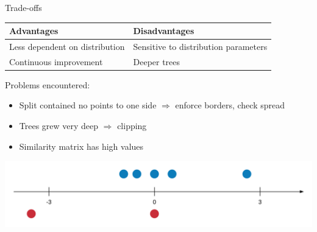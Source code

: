 \documentclass[shortpres]{beamer}
\begin{document}
\begin{frame}{Trade-offs}
    \begin{center}
    \begin{tabular}{p{5cm}|p{5cm}}
        Advantages & Disadvantages \\
        \hline
        \hline
         Less dependent on distribution & Sensitive to distribution parameters \\
         \hline
         Continuous improvement & Deeper trees
    \end{tabular}
    \end{center}
    Problems encountered:
    \begin{itemize}
        \item Split contained no points to one side $\Rightarrow$ enforce borders, check spread
        \item Trees grew very deep $\Rightarrow$ clipping
        \item Similarity matrix has high values
    \end{itemize}
    	\vspace{+1em}
        \centering
        \includegraphics[width=\textwidth]{cut_off.png}
\end{frame}
\end{document}
